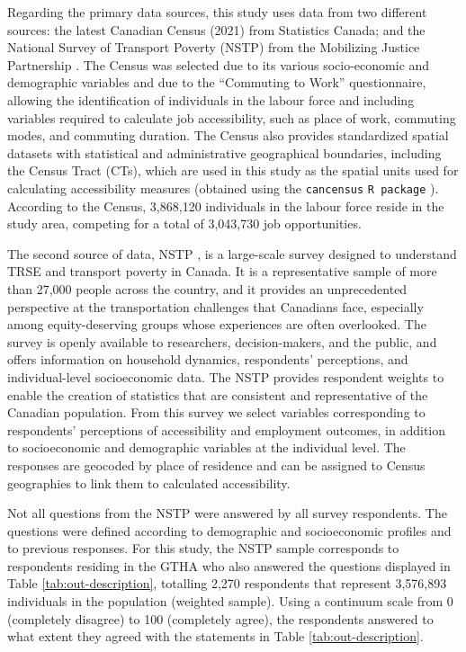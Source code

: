 \documentclass[preprint, 3p,
authoryear]{elsarticle} %
\begin{document}
Regarding the primary data sources, this study uses data from two
different sources: the latest Canadian Census (2021) from Statistics
Canada; and the National Survey of Transport Poverty (NSTP) from the
Mobilizing Justice Partnership \citep{tiznado-aitken}. The Census was
selected due to its various socio-economic and demographic variables and
due to the ``Commuting to Work'' questionnaire, allowing the
identification of individuals in the labour force and including
variables required to calculate job accessibility, such as place of
work, commuting modes, and commuting duration. The Census also provides
standardized spatial datasets with statistical and administrative
geographical boundaries, including the Census Tract (CTs), which are
used in this study as the spatial units used for calculating
accessibility measures (obtained using the \texttt{cancensus}
\texttt{R\ package} \citep{cancensus}). According to the
Census\citep{statisticscanada2023}, 3,868,120 individuals in the labour
force reside in the study area, competing for a total of 3,043,730 job
opportunities.

The second source of data, NSTP \citep{tiznado-aitken}, is a large-scale
survey designed to understand TRSE and transport poverty in Canada. It
is a representative sample of more than 27,000 people across the
country, and it provides an unprecedented perspective at the
transportation challenges that Canadians face, especially among
equity-deserving groups whose experiences are often overlooked. The
survey is openly available to researchers, decision-makers, and the
public, and offers information on household dynamics, respondents'
perceptions, and individual-level socioeconomic data. The NSTP provides
respondent weights to enable the creation of statistics that are
consistent and representative of the Canadian population. From this
survey we select variables corresponding to respondents' perceptions of
accessibility and employment outcomes, in addition to socioeconomic and
demographic variables at the individual level. The responses are
geocoded by place of residence and can be assigned to Census geographies
to link them to calculated accessibility.

Not all questions from the NSTP were answered by all survey respondents.
The questions were defined according to demographic and socioeconomic
profiles and to previous responses. For this study, the NSTP sample
corresponds to respondents residing in the GTHA who also answered the
questions displayed in Table \ref{tab:out-description}, totalling 2,270
respondents that represent 3,576,893 individuals in the population
(weighted sample). Using a continuum scale from 0 (completely disagree)
to 100 (completely agree), the respondents answered to what extent they
agreed with the statements in Table \ref{tab:out-description}.
\end{document}
